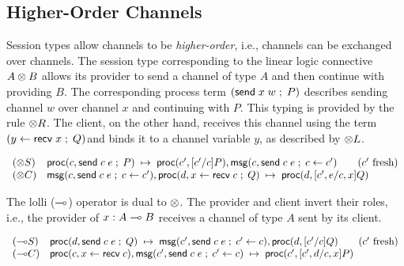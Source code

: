 \subsection*{Higher-Order Channels}
Session types allow channels to be \emph{higher-order}, i.e., channels
can be exchanged over channels. The session type corresponding to the
linear logic connective $A \tensor B$ allows its provider to send a channel
of type $A$ and then continue with providing $B$. The corresponding
process term $(\esendch{x}{w} \semi P)$ describes sending channel $w$
over channel $x$ and continuing with $P$. This typing is provided by
the rule $\tensor R$. The client, on the other hand, receives this channel
using the term $(\erecvch{x}{y} \semi Q)$and binds it to a channel
variable $y$, as described by $\tensor L$.
\[
\begin{array}{ll}
(\tensor S) & \proc{c}{\esendch{c}{e} \semi P} \step \proc{c'}{[c'/c]P},
\msg{c}{\esendch{c}{e} \semi \fwd{c}{c'}} \qquad \fresh{c'} \\
(\tensor C) & \msg{c}{\esendch{c}{e} \semi \fwd{c}{c'}},
\proc{d}{\erecvch{c}{x} \semi Q} \step \proc{d}{[c', e/c, x]Q}
\end{array}
\]

The lolli ($\lolli$) operator is dual to $\tensor$. The provider and client
invert their roles, i.e., the provider of $x : A \lolli B$ receives a channel
of type $A$ sent by its client.
\[
\begin{array}{ll}
({\lolli}S) & \proc{d}{\esendch{c}{e} \semi Q} \step
\msg{c'}{\esendch{c}{e} \semi \fwd{c'}{c}}, \proc{d}{[c'/c]Q} \qquad
\fresh{c'} \\
({\lolli}C) & \proc{c}{\erecvch{c}{x}}, \msg{c'}{\esendch{c}{e} \semi
\fwd{c'}{c}} \step \proc{c'}{[c', d/c, x]P}
\end{array}
\]

